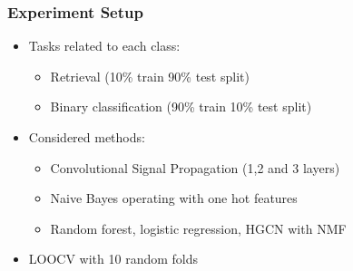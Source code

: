\documentclass[aspectratio=169]{beamer}
\begin{document}

\begin{frame}
    \frametitle{Experiment Setup}
    \begin{itemize}
        \item Tasks related to each class:
        \begin{itemize}
            \item Retrieval (10\% train 90\% test split)
            \item Binary classification (90\% train 10\% test split)
        \end{itemize}
        \item Considered methods:
        \begin{itemize}
            \item Convolutional Signal Propagation (1,2 and 3 layers)
            \item Naive Bayes operating with one hot features
            \item Random forest, logistic regression, HGCN with NMF
        \end{itemize}
        \item LOOCV with 10 random folds
    \end{itemize}
\end{frame}

\end{document}
